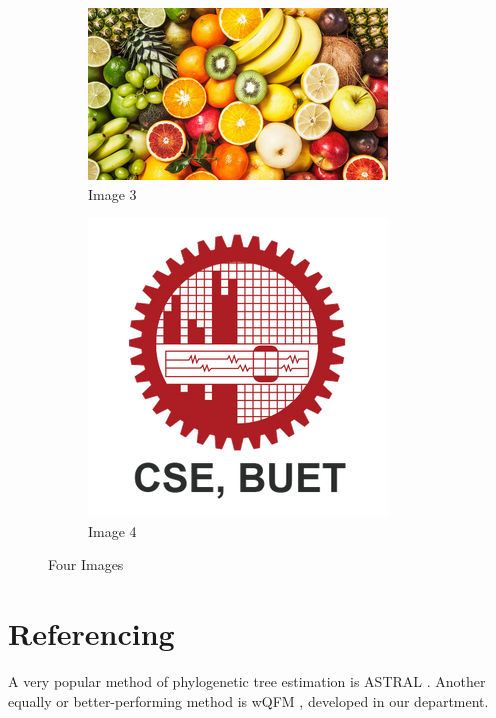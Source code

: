 \documentclass{article}
\begin{document}
\begin{figure}[h]
    \begin{subfigure}[b]{0.55\textwidth}
        \includegraphics[width=\textwidth]{Fruits.png}
        \caption{Image 3}
    \end{subfigure}
    \hfill
    \begin{subfigure}[b]{0.4\textwidth}
        \includegraphics[width=\textwidth]{CSE_BUET.png}
        \caption{Image 4}
    \end{subfigure}
    \caption{Four Images}
    \label{fig:subfigures}
\end{figure}


\section{Referencing}
A very popular method of phylogenetic tree estimation is ASTRAL \cite{Mirarab2014}. Another equally or better-performing method is wQFM \cite{Mahbub2021}, developed in our department.
\end{document}
